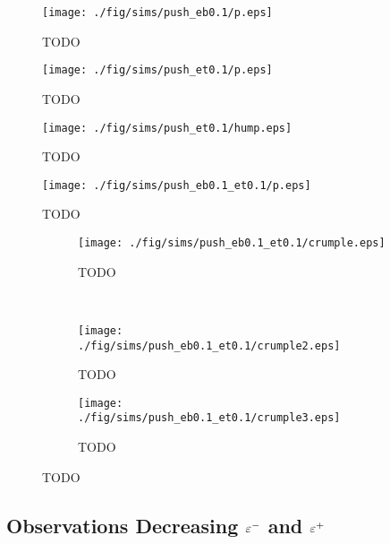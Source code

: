 	\begin{figure}
		\begin{center}
			\texttt{[image: ./fig/sims/push\_eb0.1/p.eps]}
		\end{center}		
		\caption{ TODO
		\label{fig:PushGrid:eb0.1}}
	\end{figure}	

	\begin{figure}
		\begin{center}
			\texttt{[image: ./fig/sims/push\_et0.1/p.eps]}
		\end{center}		
		\caption{ TODO
		\label{fig:PushGrid:et0.1}}
	\end{figure}
	
	\begin{figure}
		\begin{center}
			\texttt{[image: ./fig/sims/push\_et0.1/hump.eps]}
		\end{center}		
		\caption{ TODO
		\label{fig:push_hump}}
	\end{figure}	

	\begin{figure}
		\begin{center}
			\texttt{[image: ./fig/sims/push\_eb0.1\_et0.1/p.eps]}
		\end{center}		
		\caption{ TODO
		\label{fig:PushGrid:eb0.1_et0.1}}
	\end{figure}	

	\begin{figure*}
		\centering
		\begin{subfigure}{.5\textwidth}
			\centering
			\texttt{[image: ./fig/sims/push\_eb0.1\_et0.1/crumple.eps]}
			\caption{TODO \label{subfig:push_crumple}}
		\end{subfigure}%
		~
		\begin{subfigure}{.5\textwidth}
			\centering
			\texttt{[image: ./fig/sims/push\_eb0.1\_et0.1/crumple2.eps]}
			\caption{TODO \label{subfig:push_crumple2}}
		\end{subfigure}

		\begin{subfigure}{.5\textwidth}
			\centering
			\texttt{[image: ./fig/sims/push\_eb0.1\_et0.1/crumple3.eps]}
			\caption{TODO \label{subfig:push_crumple3}}
		\end{subfigure}		
		\caption{TODO\label{fig:push_crumple}}	
	\end{figure*}

\subsection{Observations Decreasing $\varepsilon^-$ and $\varepsilon^+$} \label{subsection:push:eps}

